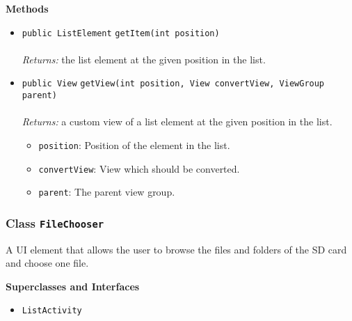 \textbf{\sffamily Methods}
\begin{itemize}
\item \lstinline|public ListElement| \lstinline|getItem|\lstinline|(int position)|\\ \\[-0.6em]
\emph{Returns:} the list element at the given position in the list.



\item \lstinline|public View| \lstinline|getView|\lstinline|(int position, View convertView, ViewGroup parent)|\\ \\[-0.6em]
\emph{Returns:} a custom view of a list element at the given position in the list.
\begin{itemize}
\item \lstinline|position|: Position of the element in the list.
\item \lstinline|convertView|: View which should be converted.
\item \lstinline|parent|: The parent view group.
\end{itemize}



\end{itemize}

\subsubsection{Class \lstinline|FileChooser|}
A UI element that allows the user to browse the files and folders of the SD card and
 choose one file. \\
\noindent\begin{minipage}[t]{5cm}
\vspace{0.3em}
\hspace*{2em}
\vspace{0.3em}
\end{minipage}



\textbf{\sffamily Superclasses and Interfaces}
\begin{itemize}
\item \lstinline|ListActivity|
\end{itemize}



